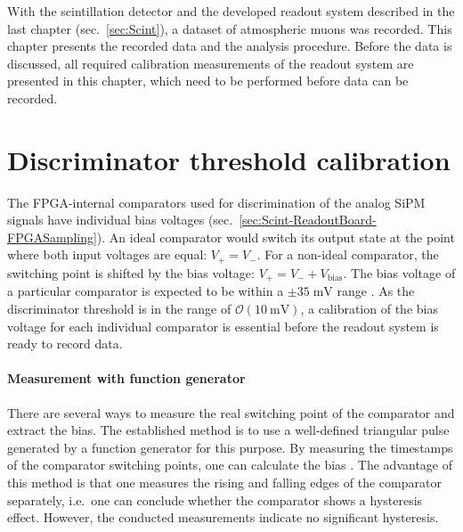 \label{sec:ScintData}
With the scintillation detector and the developed readout system described in the last chapter (sec.\ \ref{sec:Scint}), a dataset of atmospheric muons was recorded. This chapter presents the recorded data and the analysis procedure. Before the data is discussed, all required calibration measurements of the readout system are presented in this chapter, which need to be performed before data can be recorded.

\FloatBarrier
\section{Discriminator threshold calibration}
\label{sec:ScintData-VoltageBias}
The \ac{FPGA}-internal comparators used for discrimination of the analog \ac{SiPM} signals have individual bias voltages (sec.\ \ref{sec:Scint-ReadoutBoard-FPGASampling}). An ideal comparator would switch its output state at the point where both input voltages are equal: $V_+ = V_-$. For a non-ideal comparator, the switching point is shifted by the bias voltage: $V_+ = V_- + V_\text{bias}$. The bias voltage of a particular comparator is expected to be within a $\pm 35 \;\si{\milli\volt}$ range \cite{UltraScale-FPGA-SelectIO-Resources}. As the discriminator threshold is in the range of $\mathcal{O}(\SI{10}{\milli\volt})$, a calibration of the bias voltage for each individual comparator is essential before the readout system is ready to record data.
\paragraph{Measurement with function generator}
There are several ways to measure the real switching point of the comparator and extract the bias. The established method is to use a well-defined triangular pulse generated by a function generator for this purpose. By measuring the timestamps of the comparator switching points, one can calculate the bias \cite{FPGA-MVT-Xi,FPGA-MVT-Eliseev}. The advantage of this method is that one measures the rising and falling edges of the comparator separately, i.e.\ one can conclude whether the comparator shows a hysteresis effect. However, the conducted measurements indicate no significant hysteresis.
